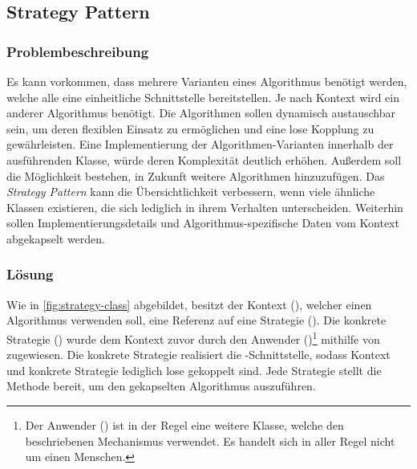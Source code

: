 \subsection{Strategy Pattern}

\subsubsection*{Problembeschreibung}

Es kann vorkommen, dass mehrere Varianten eines Algorithmus benötigt werden, welche alle eine einheitliche Schnittstelle bereitstellen. Je nach Kontext wird ein anderer Algorithmus benötigt. Die Algorithmen sollen dynamisch austauschbar sein, um deren flexiblen Einsatz zu ermöglichen und eine lose Kopplung zu gewährleisten. Eine Implementierung der Algorithmen-Varianten innerhalb der ausführenden Klasse, würde deren Komplexität deutlich erhöhen. Außerdem soll die Möglichkeit bestehen, in Zukunft weitere Algorithmen hinzuzufügen. Das \emph{Strategy Pattern} kann die Übersichtlichkeit verbessern, wenn viele ähnliche Klassen existieren, die sich lediglich in ihrem Verhalten unterscheiden. Weiterhin sollen Implementierungsdetails und Algorithmus-spezifische Daten vom Kontext abgekapselt werden. \cite{gamma_design_1995}

\subsubsection*{Lösung}

Wie in \autoref{fig:strategy-class} abgebildet, besitzt der Kontext (), welcher einen Algorithmus verwenden soll, eine Referenz auf eine Strategie (). Die konkrete Strategie () wurde dem Kontext zuvor durch den Anwender ()\footnote{Der Anwender () ist in der Regel eine weitere Klasse, welche den beschriebenen Mechanismus verwendet. Es handelt sich in aller Regel nicht um einen Menschen.\label{ftn:client}} mithilfe von  zugewiesen. Die konkrete Strategie realisiert die -Schnittstelle, sodass Kontext und konkrete Strategie lediglich lose gekoppelt sind. Jede Strategie stellt die Methode  bereit, um den gekapselten Algorithmus auszuführen.

